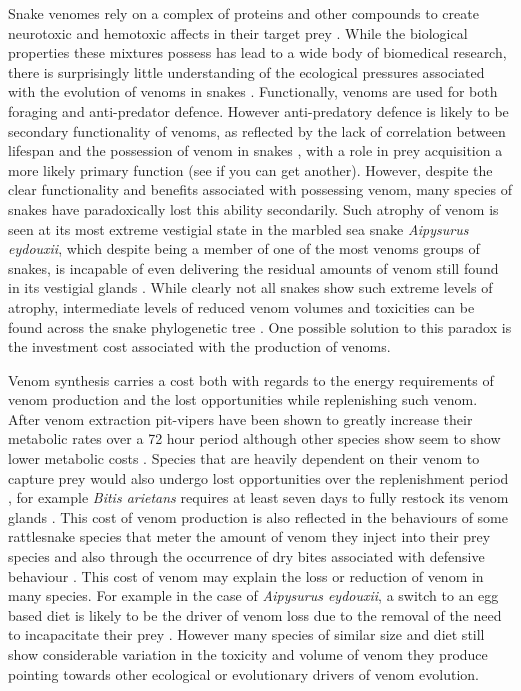 Snake venomes rely on a complex of proteins and other compounds to create neurotoxic and hemotoxic affects in their target prey \citep{greene1997snakes,casewell2013complex}. While the biological properties these mixtures possess has lead to a wide body of biomedical research, there is surprisingly little understanding of the ecological pressures associated with the evolution of venoms in snakes \citep{greene1997snakes,casewell2013complex}. Functionally, venoms are used for both foraging and anti-predator defence. However anti-predatory defence is likely to be secondary functionality of venoms, as reflected by the lack of correlation between lifespan and the possession of venom in snakes \citep{hossie2013species}, with a role in prey acquisition a more likely primary function \citep{casewell2013complex} (see if you can get another). However, despite the clear functionality and benefits associated with possessing venom, many species of snakes have paradoxically lost this ability secondarily. Such atrophy of venom is seen at its most extreme vestigial state in the marbled sea snake \textit{Aipysurus eydouxii}, which despite being a member of one of the most venoms groups of snakes, is incapable of even delivering the residual amounts of venom still found in its vestigial glands \citep{li2005eggs}. While clearly not all snakes show such extreme levels of atrophy, intermediate levels of reduced venom volumes and toxicities can be found across the snake phylogenetic tree \citep{fry2012structural}. One possible solution to this paradox is the investment cost associated with the production of venoms.


Venom synthesis carries a cost both with regards to the energy requirements of venom production and the lost opportunities while replenishing such venom. After venom extraction pit-vipers have been shown to greatly increase their metabolic rates over a 72 hour period \cite{mccue2006cost} although other species show seem to show lower metabolic costs \citep{pintor2010costs}. Species that are heavily dependent on their venom to capture prey would also undergo lost opportunities over the replenishment period \citep{young2002snakes}, for example \textit{Bitis arietans} requires at least seven days to fully restock its venom glands \citep{currier2012unusual}. This cost of venom production is also reflected in the behaviours of some rattlesnake species that meter the amount of venom they inject into their prey species \citep{hayes1995venom} and also through the occurrence of dry bites associated with defensive behaviour \citep{morgenstern2013venom}. This cost of venom may explain the loss or reduction of venom in many species. For example in the case of \textit{Aipysurus eydouxii}, a switch to an egg based diet is likely to be the driver of venom loss due to the removal of the need to incapacitate their prey \citep{li2005eggs}. However many species of similar size and diet still show considerable variation in the toxicity and volume of venom they produce pointing towards other ecological or evolutionary drivers of venom evolution.


